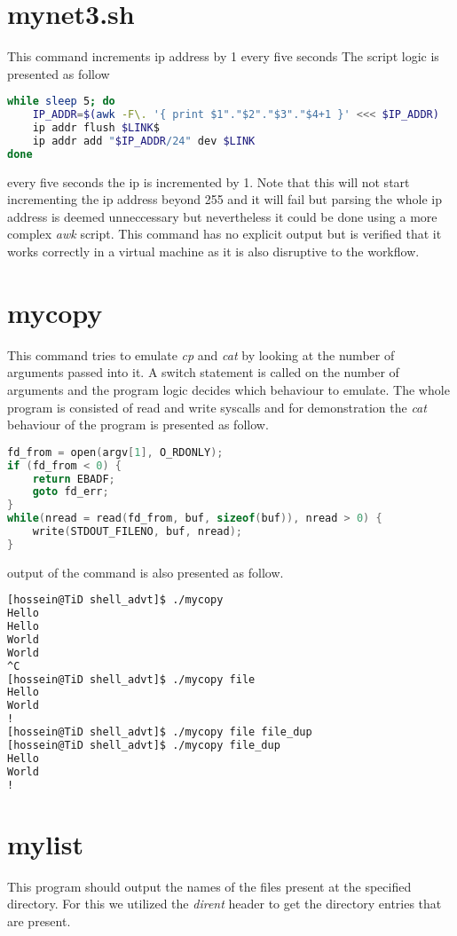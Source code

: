 \documentclass[a4paper, 11pt]{article}
\theoremstyle{nonumberplain}
\begin{document}
\section{mynet3.sh}
This command increments ip address by 1 every five seconds
The script logic is presented as follow
\begin{lstlisting}[language=bash]
while sleep 5; do
    IP_ADDR=$(awk -F\. '{ print $1"."$2"."$3"."$4+1 }' <<< $IP_ADDR)
    ip addr flush $LINK$
    ip addr add "$IP_ADDR/24" dev $LINK
done
\end{lstlisting}
every five seconds the ip is incremented by 1. Note that this will not start
incrementing the ip address beyond 255 and it will fail but parsing the whole
ip address is deemed unneccessary but nevertheless it could be done using a
more complex \textit{awk} script.
This command has no explicit output but is verified that it works correctly in
a virtual machine as it is also disruptive to the workflow.

\section{mycopy}
This command tries to emulate \textit{cp} and \textit{cat} by looking at
the number of arguments passed into it.
A switch statement is called on the number of arguments and the program
logic decides which behaviour to emulate.
The whole program is consisted of read and write syscalls and for demonstration
the \textit{cat} behaviour of the program is presented as follow.
\begin{lstlisting}[language=c]
fd_from = open(argv[1], O_RDONLY);
if (fd_from < 0) {
    return EBADF;
    goto fd_err;
}
while(nread = read(fd_from, buf, sizeof(buf)), nread > 0) {
    write(STDOUT_FILENO, buf, nread);
} 
\end{lstlisting}
output of the command is also presented as follow.
\begin{lstlisting}[language=bash]
[hossein@TiD shell_advt]$ ./mycopy
Hello
Hello
World
World
^C
[hossein@TiD shell_advt]$ ./mycopy file
Hello
World
!
[hossein@TiD shell_advt]$ ./mycopy file file_dup
[hossein@TiD shell_advt]$ ./mycopy file_dup
Hello
World
!
\end{lstlisting}

\section{mylist}
This program should output the names of the files present at the specified
directory. For this we utilized the \textit{dirent} header to get the
directory entries that are present.
\end{document}

